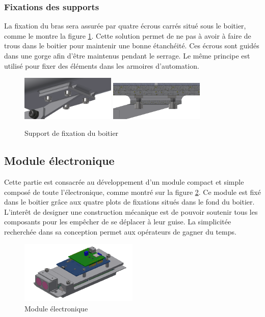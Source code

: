 \subsubsection{Fixations des supports}

La fixation du bras sera assurée par quatre écrous carrés situé sous le boitier, comme le montre la figure 
\ref{fig:supportfix}. Cette solution permet de 
ne pas à avoir à faire de trous dans le boitier pour maintenir une bonne étanchéité. Ces écrous sont 
guidés dans une gorge afin d’être maintenus pendant le serrage. Le même principe est utilisé pour 
fixer des éléments dans les armoires d'automation.

\begin{figure}[H]
    \centering
    \includegraphics[width=0.4\textwidth]{Images/photos_PGA/fixdessous2.PNG}
    \includegraphics[width=0.4\textwidth]{Images/photos_PGA/écroucarré.PNG}
    \caption{Support de fixation du boitier}
    \label{fig:supportfix}
\end{figure}

\subsection{Module électronique}

Cette partie est consacrée au développement d’un module compact et simple composé de toute l'électronique, 
comme montré sur la figure \ref{fig:elmodule}.
Ce module est fixé dans le boitier grâce aux quatre plots de fixations situés dans le fond 
du boitier. L’interêt de designer une construction mécanique est de pouvoir soutenir tous les composants 
pour les empêcher de se déplacer à leur guise. La simplicitée recherchée dans sa conception permet
aux opérateurs de gagner du temps.

\begin{figure}[H]
    \centering
    \includegraphics[width=0.5\textwidth]{Images/photos_PGA/ModuleElec2-removebg-preview.png}
    \caption{Module électronique}
    \label{fig:elmodule}
\end{figure}

